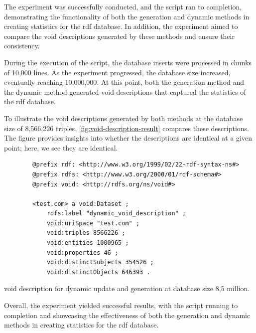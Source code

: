 The experiment was successfully conducted, and the script ran to completion, demonstrating the functionality of both the generation and dynamic methods in creating statistics for the  \gls{rdf} database. In addition, the experiment aimed to compare the \gls{void} descriptions generated by these methods and ensure their consistency.

During the execution of the script, the database inserts were processed in chunks of 10,000 lines. As the experiment progressed, the database size increased, eventually reaching 10,000,000. At this point, both the generation method and the dynamic method generated \gls{void} descriptions that captured the statistics of the  \gls{rdf} database.

To illustrate the \gls{void} descriptions generated by both methods at the database size of 8,566,226 triples, \autoref{fig:void-description-result} compares these descriptions. The figure provides insights into whether the descriptions are identical at a given point; here, we see they are identical.


\begin{listing}[htb!]
    \begin{verbatim}
        @prefix rdf: <http://www.w3.org/1999/02/22-rdf-syntax-ns#>
        @prefix rdfs: <http://www.w3.org/2000/01/rdf-schema#>
        @prefix void: <http://rdfs.org/ns/void#>
        
        <test.com> a void:Dataset ;
            rdfs:label "dynamic_void_description" ;
            void:uriSpace "test.com" ;
            void:triples 8566226 ;
            void:entities 1000965 ;
            void:properties 46 ;
            void:distinctSubjects 354526 ;
            void:distinctObjects 646393 .
    \end{verbatim}
    \caption{\gls{void} description for dynamic update and generation at database size 8,5 million.}
    \label{fig:void-description-result}
\end{listing}

Overall, the experiment yielded successful results, with the script running to completion and showcasing the effectiveness of both the generation and dynamic methods in creating statistics for the \gls{rdf} database.